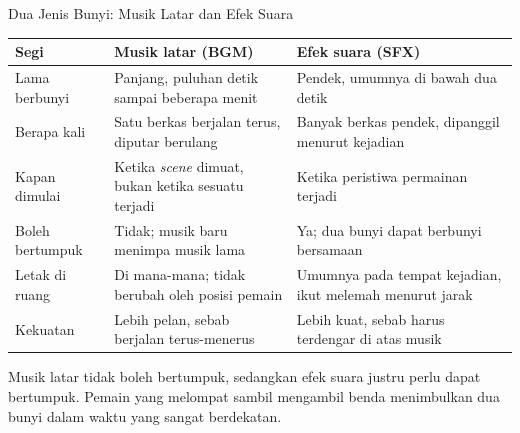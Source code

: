 \documentclass[aspectratio=169,10pt]{beamer}
\begin{document}
\begin{frame}{Dua Jenis Bunyi: Musik Latar dan Efek Suara}
{\scriptsize
\renewcommand{\arraystretch}{1.12}
\begin{tabularx}{\textwidth}{@{}>{\raggedright\arraybackslash}p{2.35cm}
    >{\raggedright\arraybackslash}p{5.55cm}
    >{\raggedright\arraybackslash}X@{}}
\toprule
\textbf{Segi} & \textbf{Musik latar (BGM)} & \textbf{Efek suara (SFX)} \\
\midrule
Lama berbunyi & Panjang, puluhan detik sampai beberapa menit &
  Pendek, umumnya di bawah dua detik \\
\addlinespace
Berapa kali & Satu berkas berjalan terus, diputar berulang &
  Banyak berkas pendek, dipanggil menurut kejadian \\
\addlinespace
Kapan dimulai & Ketika \emph{scene} dimuat, bukan ketika sesuatu terjadi &
  Ketika peristiwa permainan terjadi \\
\addlinespace
Boleh bertumpuk & Tidak; musik baru menimpa musik lama &
  Ya; dua bunyi dapat berbunyi bersamaan \\
\addlinespace
Letak di ruang & Di mana-mana; tidak berubah oleh posisi pemain &
  Umumnya pada tempat kejadian, ikut melemah menurut jarak \\
\addlinespace
Kekuatan & Lebih pelan, sebab berjalan terus-menerus &
  Lebih kuat, sebab harus terdengar di atas musik \\
\bottomrule
\end{tabularx}}
\vspace{0.14cm}
\begin{kotak}
Musik latar tidak boleh bertumpuk, sedangkan efek suara justru perlu dapat
bertumpuk. Pemain yang melompat sambil mengambil benda menimbulkan dua bunyi
dalam waktu yang sangat berdekatan.
\end{kotak}
\end{frame}
\end{document}
